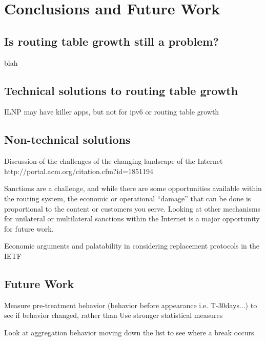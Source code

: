 \chapter{Conclusions and Future Work}
\label{chap:conclusion}

\section{Is routing table growth still a problem?}
blah


\section{Technical solutions to routing table growth}

ILNP may have killer apps, but not for ipv6 or routing table growth

%

\section{Non-technical solutions}

Discussion of the challenges of the changing landscape of the Internet http://portal.acm.org/citation.cfm?id=1851194

Sanctions are a challenge, and while there are some opportunities available within the routing system, the economic or operational ``damage'' that can be done is proportional to the content or customers you serve. Looking at other mechanisms for unilateral or multilateral sanctions within the Internet is a major opportunity for future work.

Economic arguments and palatability in considering replacement protocols in the IETF

\section{Future Work}
Measure pre-treatment behavior (behavior before appearance i.e. T-30days...) to see if behavior changed, rather than
Use stronger statistical measures

Look at aggregation behavior moving down the list to see where a break occurs